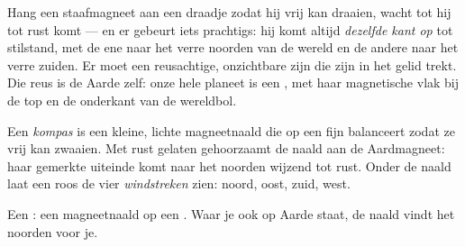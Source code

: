\begin{example}\label{ex:g4:magnets-and-compass:earth}
Hang een staafmagneet aan een draadje zodat hij vrij kan draaien,
wacht tot hij tot rust komt --- en er gebeurt iets prachtigs: hij
komt altijd \emph{dezelfde kant op} tot stilstand, met de ene
 naar het verre noorden van de wereld en de andere naar het
verre zuiden. Er moet een reusachtige, onzichtbare  zijn die
zijn  in het gelid trekt. Die reus is de Aarde zelf: onze hele
planeet is een , met haar magnetische  vlak bij de top
en de onderkant van de wereldbol.
\end{example}

\begin{definition}[Kompas]\label{def:g4:magnets-and-compass:compass}
Een \emph{kompas} is een kleine, lichte
magneetnaald die op een fijn  balanceert zodat ze vrij kan
zwaaien. Met rust gelaten gehoorzaamt de naald aan de
Aardmagneet: haar gemerkte uiteinde komt naar het noorden wijzend tot
rust. Onder de naald laat een roos de vier
\emph{windstreken} zien: noord, oost, zuid, west.
\end{definition}

\begin{omfigure}

{\small Een : een magneetnaald op een . Waar je ook
op Aarde staat, de naald vindt het noorden voor je.}
\end{omfigure}


